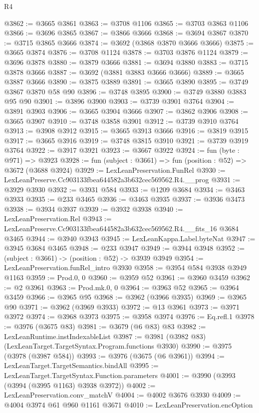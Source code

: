 \begin{lexlean}{R4}
\begin{coremodule}
@3862 := @3665 @3861
@3863 := @3708 @1106
@3865 := @3703 @3863 @1106
@3866 := @3696 @3865
@3867 := @3866 @3666
@3868 := @3694 @3867
@3870 := @3715 @3865 @3666
@3874 := @3692 (@3868 @3870 @3666 @3666)
@3875 := @3665 @3874
@3876 := @3708 @1124
@3878 := @3703 @3876 @1124
@3879 := @3696 @3878
@3880 := @3879 @3666
@3881 := @3694 @3880
@3883 := @3715 @3878 @3666
@3887 := @3692 (@3881 @3883 @3666 @3666)
@3889 := @3665 @3887 @3666
@3890 := @3875 @3889
@3891 := @3665 @3890
@3895 := @3749 @3867 @3870 @58 @90
@3896 := @3748 @3895
@3900 := @3749 @3880 @3883 @95 @90
@3901 := @3896 @3900
@3903 := @3739 @3901 @3764
@3904 := @3891 @3903
@3906 := @3665 @3904 @3666
@3907 := @3862 @3906
@3908 := @3665 @3907
@3910 := @3748 @3858 @3901
@3912 := @3739 @3910 @3764
@3913 := @3908 @3912
@3915 := @3665 @3913 @3666
@3916 := @3819 @3915
@3917 := @3665 @3916
@3919 := @3748 @3815 @3910
@3921 := @3739 @3919 @3764
@3922 := @3917 @3921
@3923 := @3667 @3922
@3924 := fun (byte : @971) => @3923
@3928 := fun (subject : @3661) => fun (position : @52) => @3672 (@3688 @3924)
@3929 := LexLeanPreservation.FunRel
@3930 := LexLeanPreserve.Cc903133fbea644582a3b632cec569562.R4.__prog
@3931 := @3929 @3930
@3932 := @3931 @584
@3933 := @1209 @3684
@3934 := @3463 @3933
@3935 := @233 @3465
@3936 := @3463 @3935
@3937 := @3936 @3473
@3938 := @3934 @3937
@3939 := @3932 @3938
@3940 := LexLeanPreservation.Rel
@3943 := LexLeanPreserve.Cc903133fbea644582a3b632cec569562.R4.__fits_16 @3684 @3465
@3944 := @3940 @3943
@3945 := LexLeanKappa.Label.byteNat
@3947 := @3945 @3684 @3465
@3948 := @233 @3947
@3949 := @3944 @3948
@3952 := (subject : @3661) -> (position : @52) -> @3939 @3949
@3954 := LexLeanPreservation.funRel_intro @3930
@3958 := @3954 @584 @3938 @3949 @1163
@3959 := Prod.{0, 0}
@3960 := @3959 @52
@3961 := @3960 @3459
@3962 := @2 @3961
@3963 := Prod.mk.{0, 0}
@3964 := @3963 @52
@3965 := @3964 @3459
@3966 := @3965 @95
@3968 := @3962 (@3966 @3935)
@3969 := @3965 @90
@3971 := @3962 (@3969 @3933)
@3972 := @13 @3961
@3973 := @3971 @3972
@3974 := @3968 @3973
@3975 := @3958 @3974
@3976 := Eq.refl.{1}
@3978 := @3976 (@3675 @83)
@3981 := @3679 (@6 @83) @83
@3982 := LexLeanRuntime.instIndexableList
@3987 := @3981 (@3982 @83) (LexLeanTarget.TargetSyntax.Program.functions @3930)
@3990 := @3975 (@3978 (@3987 @584))
@3993 := @3976 (@3675 (@6 @3961))
@3994 := LexLeanTarget.TargetSemantics.bindAll
@3995 := LexLeanTarget.TargetSyntax.Function.parameters
@4001 := @3990 (@3993 (@3994 (@3995 @1163) @3938 @3972))
@4002 := LexLeanPreservation.conv_matchV
@4004 := @4002 @3676 @3930
@4009 := @4004 @3974 @61 @960 @1161 @3671
@4010 := LexLeanPreservation.encOption

\end{coremodule}
\end{lexlean}
